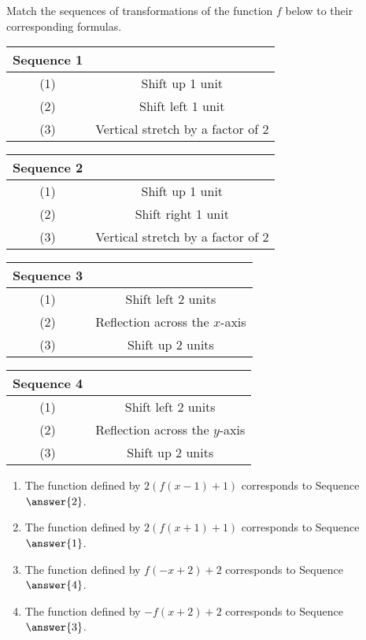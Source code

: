 \documentclass{ximera}
\author{Kenneth Berglund}
\begin{document}
\begin{exercise}
Match the sequences of transformations of the function $f$ below to their corresponding formulas.

\begin{tabular}{cc}
Sequence 1\\
\hline
(1) & Shift up 1 unit \\
(2) & Shift left 1 unit \\
(3) & Vertical stretch by a factor of 2 
\end{tabular}
\quad
\begin{tabular}{cc}
Sequence 2\\
\hline
(1) & Shift up 1 unit \\
(2) & Shift right 1 unit \\
(3) &  Vertical stretch by a factor of 2
\end{tabular}
\quad
\begin{tabular}{cc}
Sequence 3\\
\hline
(1) & Shift left 2 units\\
(2) & Reflection across the $x$-axis \\
(3) & Shift up 2 units
\end{tabular}
\quad
\begin{tabular}{cc}
Sequence 4\\
\hline
(1) & Shift left 2 units\\
(2) & Reflection across the $y$-axis \\
(3) & Shift up 2 units
\end{tabular}

\begin{enumerate}
\item The function defined by $2(f(x - 1) +1)$ corresponds to Sequence $\answer{2}$.
\item The function defined by $2(f(x + 1) + 1)$ corresponds to Sequence $\answer{1}$.
\item The function defined by $f(-x + 2) + 2$ corresponds to Sequence $\answer{4}$.
\item The function defined by $-f(x + 2) + 2$ corresponds to Sequence $\answer{3}$.
\end{enumerate} 
\end{exercise}
\end{document}
